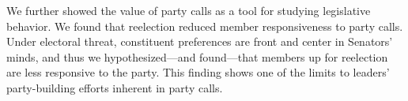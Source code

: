 \documentclass[12pt]{article}
\begin{document}
We further showed the value of party calls as a tool for studying legislative behavior.  We found that reelection reduced member responsiveness to party calls.  Under electoral threat, constituent preferences are front and center in Senators' minds, and thus we hypothesized---and found---that members up for reelection are less responsive to the party. This finding shows one of the limits to leaders' party-building efforts inherent in party calls.

\singlespacing

\end{document}
